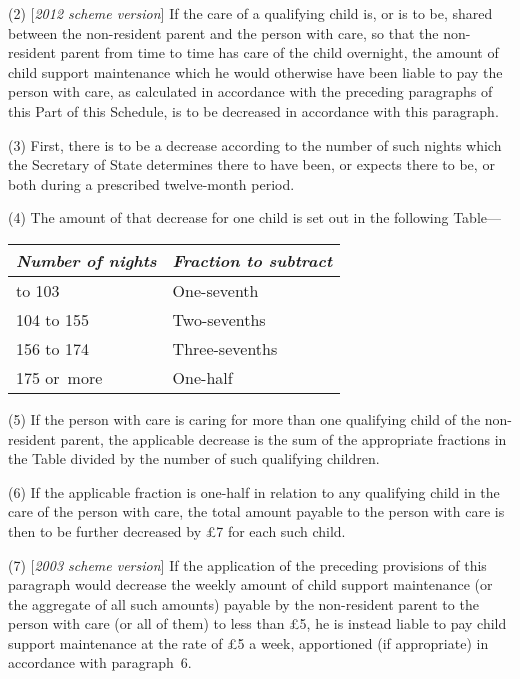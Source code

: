 \documentclass[12pt,a4paper]{article}
\begin{document}
(2) [\emph{2012 scheme version}] 
If the care of a qualifying child is, or is to be, shared  %
between the non-resident parent and the person with care, so that the non-resident parent from time to time has care of the child overnight, the amount of child support maintenance which he would otherwise have been liable to pay the person with care, as calculated in accordance with the preceding paragraphs of this Part of this Schedule, is to be decreased in accordance with this paragraph.

(3) First, there is to be a decrease according to the number of such nights which the 
Secretary of State  %
determines there to have been, or expects there to be, or both during a prescribed twelve-month period.

(4) The amount of that decrease for one child is set out in the following Table—

\medskip

{\footnotesize\noindent
\begin{longtable}{ll}
\hline
\itshape Number of nights	& \itshape Fraction to subtract\\
\hline
\endhead
\hline
\endlastfoot
52 to 103	&One-seventh\\
104 to 155	&Two-sevenths\\
156 to 174	&Three-sevenths\\
175 or~more	&One-half\\
\end{longtable}

}

\medskip

(5) If the person with care is caring for more than one qualifying child of the non-resident parent, the applicable decrease is the sum of the appropriate fractions in the Table divided by the number of such qualifying children.

(6) If the applicable fraction is one-half in relation to any qualifying child in the care of the person with care, the total amount payable to the person with care is then to be further decreased by £7 for each such child.

(7) [\emph{2003 scheme version}] If the application of the preceding provisions of this paragraph would decrease the weekly amount of child support maintenance (or the aggregate of all such amounts) payable by the non-resident parent to the person with care (or all of them) to less than £5, he is instead liable to pay child support maintenance at the rate of £5 a week, apportioned (if appropriate) in accordance with paragraph~6. 
\end{document}
